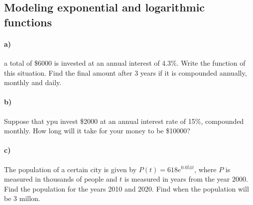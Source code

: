 \documentclass[../main.tex]{subfiles}
\begin{document}

\subsection{Modeling exponential and logarithmic functions}

\paragraph{a)} a total of \$\num{6000} is invested at an annual interest of 4.3\%.
Write the function of this situation.
Find the final amount after 3 years if it is compounded annually, monthly and daily.

\newpage

\paragraph{b)} Suppose that ypu invest \$\num{2000} at an annual interest rate of 15\%, compounded monthly.
How long will it take for your money to be \$\num{10000}?

\newpage

\paragraph{c)} The population of a certain city is given by $P(t)=618e^{0.051t}$, where $P$ is measured in thousands of people and $t$ is measured in years from the year $2000$.
Find the population for the years 2010 and 2020.
Find when the population will be 3 millon.
\end{document}
